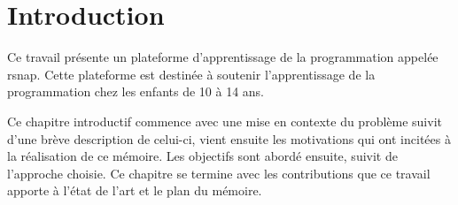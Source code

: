 \chapter{Introduction}
Ce travail présente un plateforme d'apprentissage de la programmation appelée \gls{rsnap}. Cette plateforme est destinée à soutenir l'apprentissage de la programmation chez les enfants de 10 à 14 ans.

Ce chapitre introductif commence avec une mise en contexte du problème suivit d'une brève description de celui-ci, vient ensuite les motivations qui ont incitées à la réalisation de ce mémoire. Les objectifs sont abordé ensuite, suivit de l'approche choisie. Ce chapitre se termine avec les contributions que ce travail apporte à l'état de l'art et le plan du mémoire.
 







